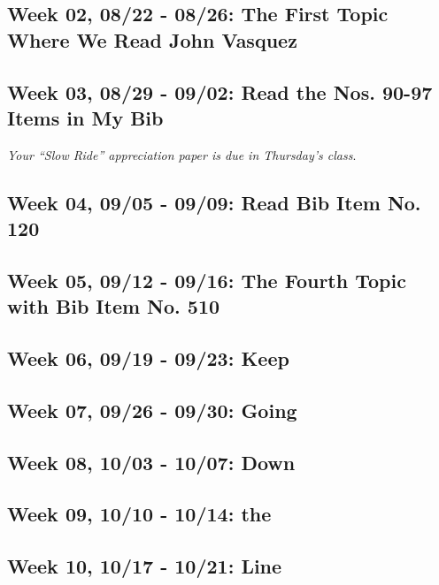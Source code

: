 \documentclass[11pt,]{article}
\begin{document}
\subsection{Week 02, 08/22 - 08/26: The First Topic Where We Read John
Vasquez}\label{week-02-0822---0826-the-first-topic-where-we-read-john-vasquez}

\subsection{Week 03, 08/29 - 09/02: Read the Nos. 90-97 Items in My
Bib}\label{week-03-0829---0902-read-the-nos.-90-97-items-in-my-bib}

\emph{Your ``Slow Ride'' appreciation paper is due in Thursday's class}.

\subsection{Week 04, 09/05 - 09/09: Read Bib Item No.
120}\label{week-04-0905---0909-read-bib-item-no.-120}

\subsection{Week 05, 09/12 - 09/16: The Fourth Topic with Bib Item No.
510}\label{week-05-0912---0916-the-fourth-topic-with-bib-item-no.-510}

\subsection{Week 06, 09/19 - 09/23:
Keep}\label{week-06-0919---0923-keep}

\subsection{Week 07, 09/26 - 09/30:
Going}\label{week-07-0926---0930-going}

\subsection{Week 08, 10/03 - 10/07:
Down}\label{week-08-1003---1007-down}

\subsection{Week 09, 10/10 - 10/14: the}\label{week-09-1010---1014-the}

\subsection{Week 10, 10/17 - 10/21:
Line}\label{week-10-1017---1021-line}
\end{document}
